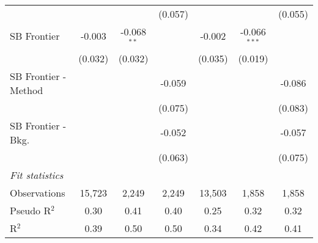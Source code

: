 \begin{tabular}{lcccccc}
                        &         &               & (0.057)     &              &                & (0.055)\\   
   SB Frontier          & -0.003  & -0.068$^{**}$ &             & -0.002       & -0.066$^{***}$ &   \\   
                        & (0.032) & (0.032)       &             & (0.035)      & (0.019)        &   \\   
   SB Frontier - Method &         &               & -0.059      &              &                & -0.086\\   
                        &         &               & (0.075)     &              &                & (0.083)\\   
   SB Frontier - Bkg.   &         &               & -0.052      &              &                & -0.057\\   
                        &         &               & (0.063)     &              &                & (0.075)\\   
   \midrule
   \emph{Fit statistics}\\
   Observations         & 15,723  & 2,249         & 2,249       & 13,503       & 1,858          & 1,858\\  
   Pseudo R$^2$         & 0.30    & 0.41          & 0.40        & 0.25         & 0.32           & 0.32\\  
   R$^2$                & 0.39    & 0.50          & 0.50        & 0.34         & 0.42           & 0.41\\  
   

\end{tabular}
